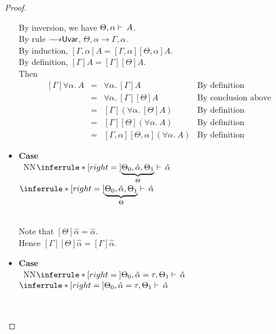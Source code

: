 \documentclass[a4paper]{article}
\def\CompactJudgments{0}
\newcommand{\entails}{\mathrel{\ifnum\CompactJudgments=1\vdash \else \vdash\,\fi}}
\gdef\xxDerivationProofCaseColor{N}
\newcommand{\DerivationProofCase}[3]{\smallskip
     \item \parbox[t]{100ex}{\textbf{Case } \\[-0.5em]
       $~$\hspace{5ex}
       \if\xxDerivationProofCaseColor N\ensuremath{\Infer{#1}{#2}{#3}}
       \else \colorbox{\xxDerivationProofCaseColor}{\ensuremath{\Infer{#1}{#2}{#3}}}\fi }\nopagebreak \\[-0.8ex]
  }
\newcommand{\AllSym}{\forall}
\newcommand{\xAll}[1]{\AllSym#1}
\newcommand{\All}[1]{\xAll{#1}.\:}
\newcommand{\Infer}[3]{\inferrule*[right={\text{\strut#1}}]{{}#2\mathstrut}{{}#3\mathstrut}}
\newcommand{\alltype}[1]{\All{#1}}
\newcommand{\extendssym}{\longrightarrow}
\newcommand{\extends}[2]{{#1} \extendssym {#2}}
\newcommand{\substextend}[2]{\extends{#1}{#2}}
\newcommand{\judgetp}[2]{{#1} \entails {#2}}
\newcommand{\ahat}{\hat{\alpha}}
\newcommand{\rulename}[1]{\text{\normalfont\textsf{#1}}}
\newcommand{\substextendrulename}[1]{\ensuremath{{\extendssym}{\rulename{#1}}}\xspace}
\newcommand{\substextendUU}{\substextendrulename{Uvar}}
\begin{document}
\begin{proof}
\begin{itemize}
          By inversion, we have $\judgetp{\Theta, \alpha}{A}$. \\
          By rule \substextendUU, $\substextend{\Theta, \alpha}{\Gamma, \alpha}$. \\
          By induction, $[\Gamma, \alpha]A = [\Gamma, \alpha][\Theta, \alpha]A$. \\
          By definition, $[\Gamma]A = [\Gamma][\Theta]A$.  \\
          Then 
          \begin{displaymath}
          \begin{array}{lcll}
            [\Gamma]\alltype{\alpha}{A} & = & \alltype{\alpha}{[\Gamma]A} & \mbox{By definition} \\
                              & = & \alltype{\alpha}{[\Gamma][\Theta]A} & \mbox{By conclusion above } \\
                              & = & [\Gamma](\alltype{\alpha}{[\Theta]A}) & \mbox{By definition} \\
                              & = & [\Gamma][\Theta](\alltype{\alpha}{A}) & \mbox{By definition} \\
                              & = & [\Gamma, \alpha][\Theta, \alpha](\alltype{\alpha}{A}) & \mbox{By definition} 
          \end{array}
          \end{displaymath}                  

      \DerivationProofCase{}
                          { }
                          {\judgetp{\underbrace{\Theta_0, \ahat, \Theta_1}_{\Theta}}{\ahat}}

           Note that $[\Theta]\ahat = \ahat$. \\
           Hence $[\Gamma][\Theta]\ahat = [\Gamma]\ahat$. 


      \DerivationProofCase{}
                          {}
                          {\judgetp{\Theta_0, \ahat=\tau, \Theta_1}{\ahat}}



\end{itemize}
\end{proof}
\end{document}
